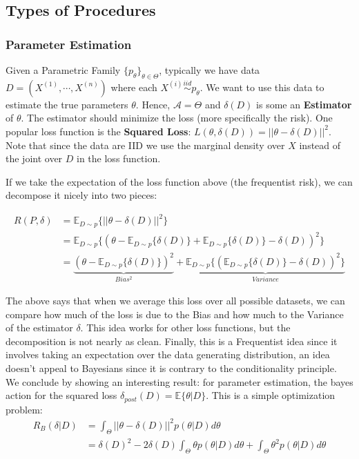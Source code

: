 \documentclass[]{article}
\theoremstyle{mattstyle}
\theoremstyle{definition}
\begin{document}
\newpage

\subsection{Types of Procedures}

\subsubsection{Parameter Estimation}\label{sec:parest}
Given a Parametric Family $\{p_{\theta}\}_{\theta\in\Theta}$, typically we have data \(D=(X^{(1)}, \cdots, X^{(n)})\) where each \(X^{(i)}\overset{iid}{\sim} p_{\theta}\). We want to use this data to estimate the true parameters \(\theta\). Hence, \(\mathcal{A} = \Theta\) and $\delta(D)$ is some an \textbf{Estimator} of \(\theta\). The estimator should minimize the loss (more specifically the risk). One popular loss function is the \textbf{Squared Loss}: \(L(\theta,\delta(D)) = ||\theta-\delta(D)||^2\). Note that since the data are IID we use the marginal density over $X$ instead of the joint over $D$ in the loss function.

If we take the expectation of the loss function above (the frequentist risk), we can decompose it nicely into two pieces:

\begin{align*}
R(P,\delta)&=\mathbb{E}_{D\sim p}\{||\theta-\delta(D)||^2\}\\
&=\mathbb{E}_{D\sim p}\{(\theta-\mathbb{E}_{D\sim p}\{\delta(D)\} + \mathbb{E}_{D\sim p}\{\delta(D)\} - \delta(D))^2\}\\
&=\underbrace{(\theta-\mathbb{E}_{D\sim p}\{\delta(D)\})^2}_{Bias^2} + \underbrace{\mathbb{E}_{D\sim p}\{(\mathbb{E}_{D\sim p}\{\delta(D)\} - \delta(D))^2\}}_{Variance}
\end{align*}

The above says that when we average this loss over all possible datasets, we can compare how much of the loss is due to the Bias and how much to the Variance of the estimator $\delta$. This idea works for other loss functions, but the decomposition is not nearly as clean. Finally, this is a Frequentist idea since it involves taking an expectation over the data generating distribution, an idea doesn't appeal to Bayesians since it is contrary to the conditionality principle. 
\\

We conclude by showing an interesting result: for parameter estimation, the bayes action for the squared loss
\(\delta_{post}(D) = \mathbb{E}\{\theta|D\}\). This is a simple optimization problem:
\begin{align*}
R_B(\delta|D) &= \int_{\Theta}^{}||\theta-\delta(D)||^2p(\theta|D)d\theta \\
&=\delta(D)^2 -2\delta(D)\int_{\Theta}^{}\theta p(\theta|D)d\theta+\int_{\Theta}^{}\theta^2 p(\theta|D)d\theta
\end{align*}
\end{document}
